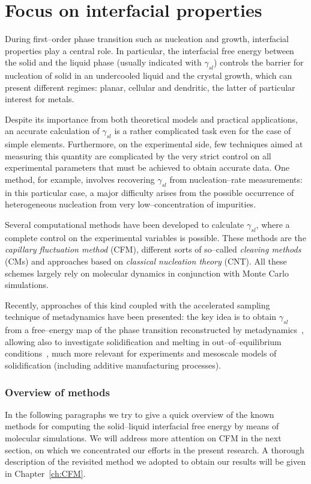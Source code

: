 \section{Focus on interfacial properties}
During first--order phase transition such as nucleation and growth, interfacial properties play a central role. In particular, the interfacial free energy between the solid and the liquid phase (usually indicated with $\gamma_{sl}$) controls the barrier for nucleation of solid in an undercooled liquid and the crystal growth, which can present different regimes: planar, cellular and dendritic, the latter of particular interest for metals.

Despite its importance from both theoretical models and practical applications, an accurate calculation of $\gamma_{sl}$ is a rather complicated task even for the case of simple elements. Furthermore, on the experimental side, few techniques aimed at measuring this quantity are complicated by the very strict control on all experimental parameters that must be achieved to obtain accurate data. One method, for example, involves recovering $\gamma_{sl}$ from nucleation--rate measurements: in this particular case, a major difficulty arises from the possible occurrence of heterogeneous nucleation from very low--concentration of impurities.

Several computational methods have been developed to calculate $\gamma_{sl}$, where a complete control on the experimental variables is possible. These methods are the \emph{capillary fluctuation method} (CFM), different sorts of so--called \emph{cleaving methods} (CMs) and approaches based on \emph{classical nucleation theory} (CNT). All these schemes largely rely on molecular dynamics in conjunction with Monte Carlo simulations.

Recently, approaches of this kind coupled with the accelerated sampling technique of metadynamics have been presented: the key idea is to obtain $\gamma_{sl}$ from a free--energy map of the phase transition reconstructed by metadynamics~\cite{Angioletti-Uberti2010}, allowing also to investigate solidification and melting in out--of--equilibrium conditions~\cite{Cheng2015}, much more relevant for experiments and mesoscale models of solidification (including additive manufacturing processes).

\subsubsection{Overview of methods}
In the following paragraphs we try to give a quick overview of the known methods for computing the solid--liquid interfacial free energy by means of molecular simulations. We will address more attention on CFM in the next section, on which we concentrated our efforts in the present research. A thorough description of the revisited method we adopted to obtain our results will be given in Chapter~\ref{ch:CFM}.

